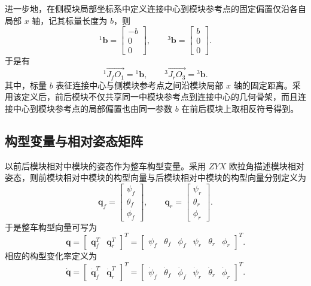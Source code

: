 进一步地，在侧模块局部坐标系中定义连接中心到模块参考点的固定偏置仅沿各自局部 $x$ 轴，记其标量长度为 $b$，则
\begin{equation}
{}^{1}\mathbf b=
\begin{bmatrix}
-b\\
0\\
0
\end{bmatrix},
\qquad
{}^{3}\mathbf b=
\begin{bmatrix}
b\\
0\\
0
\end{bmatrix}.
\end{equation}
于是有
\begin{equation}
{}^{1}\overrightarrow{J_fO_1}={}^{1}\mathbf b,
\qquad
{}^{3}\overrightarrow{J_rO_3}={}^{3}\mathbf b.
\end{equation}
其中，标量 $b$ 表征连接中心与侧模块参考点之间沿模块局部 $x$ 轴的固定距离。采用该定义后，前后模块不仅共享同一中模块参考点到连接中心的几何骨架，而且连接中心到模块参考点的局部偏置也由同一参数 $b$ 在前后模块上取相反符号得到。

\subsection{构型变量与相对姿态矩阵}

以前后模块相对中模块的姿态作为整车构型变量。采用 $ZYX$ 欧拉角描述模块相对姿态，则前模块相对中模块的构型向量与后模块相对中模块的构型向量分别定义为
\begin{equation}
\mathbf q_f=
\begin{bmatrix}
\psi_f\\
\theta_f\\
\phi_f
\end{bmatrix},
\qquad
\mathbf q_r=
\begin{bmatrix}
\psi_r\\
\theta_r\\
\phi_r
\end{bmatrix}.
\end{equation}
于是整车构型向量可写为
\begin{equation}
\mathbf q=
\begin{bmatrix}
\mathbf q_f^T & \mathbf q_r^T
\end{bmatrix}^{T}
=
\begin{bmatrix}
\psi_f & \theta_f & \phi_f & \psi_r & \theta_r & \phi_r
\end{bmatrix}^{T}.
\end{equation}
相应的构型变化率定义为
\begin{equation}
\dot{\mathbf q}=
\begin{bmatrix}
\dot{\mathbf q}_f^T & \dot{\mathbf q}_r^T
\end{bmatrix}^{T}
=
\begin{bmatrix}
\dot\psi_f & \dot\theta_f & \dot\phi_f & \dot\psi_r & \dot\theta_r & \dot\phi_r
\end{bmatrix}^{T}.
\end{equation}

